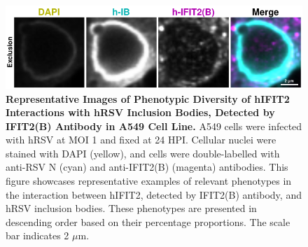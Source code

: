 \begin{figure}
    \centering
    \includegraphics[width=1\linewidth]{08. Chapter 3/Figs/02. Infection/02. IFIT2/02. IFIT2B/03. i2b-a549.pdf} 
    \caption[Representative Images of Phenotypic Diversity of hIFIT2 Interactions with hRSV Inclusion Bodies, Detected by IFIT2(B) Antibody in A549 Cell Line.]{\textbf{Representative Images of Phenotypic Diversity of hIFIT2 Interactions with hRSV Inclusion Bodies, Detected by IFIT2(B) Antibody in A549 Cell Line.} A549 cells were infected with hRSV at MOI 1 and fixed at 24 HPI. Cellular nuclei were stained with DAPI (yellow), and cells were double-labelled with anti-RSV N (cyan) and anti-IFIT2(B) (magenta) antibodies. This figure showcases representative examples of relevant phenotypes in the interaction between hIFIT2, detected by IFIT2(B) antibody, and hRSV inclusion bodies. These phenotypes are presented in descending order based on their percentage proportions. The scale bar indicates 2 \(\mu \mbox{m}\).}
    \label{fig:Representative Images of Phenotypic Diversity of hIFIT2 Interactions with hRSV Inclusion Bodies, Detected by IFIT2(B) Antibody in A549 Cell Line}
\end{figure}

